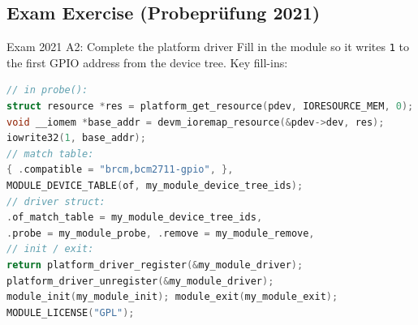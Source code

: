 \subsection{Exam Exercise (Probepr\"ufung 2021)}

\begin{example2}{Exam 2021 A2: Complete the platform driver}
    Fill in the module so it writes \texttt{1} to the first GPIO address from the
    device tree. Key fill-ins:
    \tcblower
\begin{lstlisting}[language=C, style=basesmol, aboveskip=2pt, belowskip=2pt]
// in probe():
struct resource *res = platform_get_resource(pdev, IORESOURCE_MEM, 0);
void __iomem *base_addr = devm_ioremap_resource(&pdev->dev, res);
iowrite32(1, base_addr);
// match table:
{ .compatible = "brcm,bcm2711-gpio", },
MODULE_DEVICE_TABLE(of, my_module_device_tree_ids);
// driver struct:
.of_match_table = my_module_device_tree_ids,
.probe = my_module_probe, .remove = my_module_remove,
// init / exit:
return platform_driver_register(&my_module_driver);
platform_driver_unregister(&my_module_driver);
module_init(my_module_init); module_exit(my_module_exit);
MODULE_LICENSE("GPL");
\end{lstlisting}
\end{example2}

\raggedcolumns
